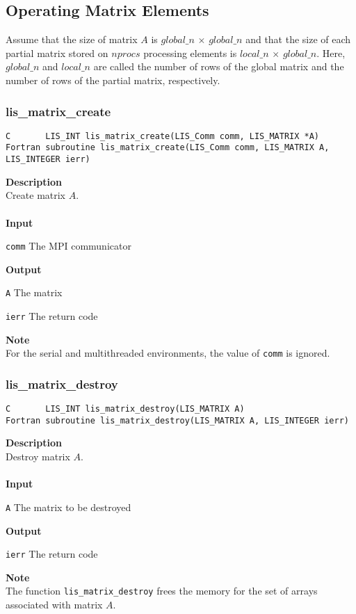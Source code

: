 \documentclass[a4paper]{article}
\newcommand{\namelistlabel}[1]{\mbox{#1}\hfill}
\newenvironment{namelist}[1]{%
\begin{list}{}
  {\let\makelabel\namelistlabel
  \settowidth{\labelwidth}{#1}
  \setlength{\leftmargin}{1.1\labelwidth}}
  }{%
\end{list}}
\begin{document}
\newpage
\subsection{Operating Matrix Elements}
Assume that the size of matrix $A$ is $global\_n$ $\times$ $global\_n$
and that the size of each partial matrix stored on $nprocs$ 
processing elements is $local\_n$ $\times$ $global\_n$. Here, $global\_n$
and $local\_n$ are called the number of rows of the global matrix
and the number of rows of the partial matrix, respectively. 
\subsubsection{lis\_matrix\_create}
\begin{screen}
\verb|C       LIS_INT lis_matrix_create(LIS_Comm comm, LIS_MATRIX *A)|
\verb|Fortran subroutine lis_matrix_create(LIS_Comm comm, LIS_MATRIX A, LIS_INTEGER ierr)|
\end{screen}
{\bf Description}\\
\indent
Create matrix $A$.
\\ \\
\noindent
{\bf Input}
\begin{namelist}{XXXXXXXXXXXXXXXXXXXX}
\item[\tt comm] The MPI communicator
\end{namelist}
{\bf Output}
\begin{namelist}{XXXXXXXXXXXXXXXXXXXX}
\item[\tt A] The matrix
\item[\tt ierr] The return code
\end{namelist}
{\bf Note}\\
\indent
For the serial and multithreaded environments, the value of {\tt comm} is ignored. 

\subsubsection{lis\_matrix\_destroy}
\begin{screen}
\verb|C       LIS_INT lis_matrix_destroy(LIS_MATRIX A)|\\
\verb|Fortran subroutine lis_matrix_destroy(LIS_MATRIX A, LIS_INTEGER ierr)|
\end{screen}
{\bf Description}\\
\indent
Destroy matrix $A$.
\\ \\
\noindent
{\bf Input}
\begin{namelist}{XXXXXXXXXXXXXXXXXXXX}
\item[\tt A] The matrix to be destroyed
\end{namelist}
{\bf Output}
\begin{namelist}{XXXXXXXXXXXXXXXXXXXX}
\item[\tt ierr] The return code
\end{namelist}
{\bf Note}\\
\indent
The function \verb|lis_matrix_destroy| frees the memory 
for the set of arrays associated with matrix $A$.
\end{document}

